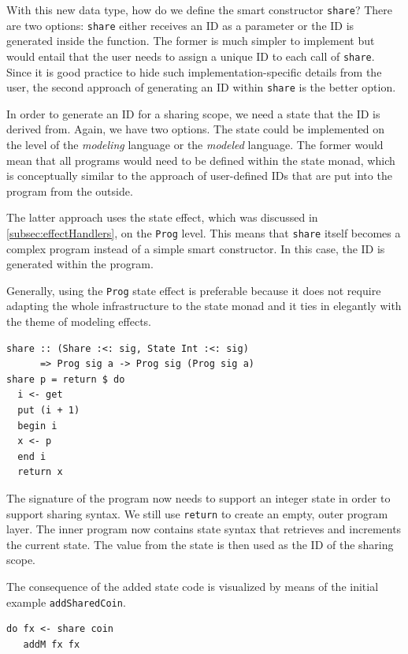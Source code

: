 \documentclass[a4paper, 11pt, fleqn, twoside]{scrreprt}
\newcommand{\hinl}[1]{\texttt{#1}}
\begin{document}
With this new data type, how do we define the smart constructor \hinl{share}?
There are two options: \hinl{share} either receives an ID as a parameter or the ID is generated inside the function.
The former is much simpler to implement but would entail that the user needs to assign a unique ID to each call of \hinl{share}.
Since it is good practice to hide such implementation-specific details from the user, the second approach of generating an ID within \hinl{share} is the better option.

In order to generate an ID for a sharing scope, we need a state that the ID is derived from.
Again, we have two options.
The state could be implemented on the level of the \textit{modeling} language or the \textit{modeled} language.
The former would mean that all programs would need to be defined within the state monad, which is conceptually similar to the approach of user-defined IDs that are put into the program from the outside.

The latter approach uses the state effect, which was discussed in \autoref{subsec:effectHandlers},  on the \hinl{Prog} level.
This means that \hinl{share} itself becomes a complex program instead of a simple smart constructor.
In this case, the ID is generated within the program.

Generally, using the \hinl{Prog} state effect is preferable because it does not require adapting the whole infrastructure to the state monad and it ties in elegantly with the theme of modeling effects.

\begin{verbatim}
share :: (Share :<: sig, State Int :<: sig) 
      => Prog sig a -> Prog sig (Prog sig a)
share p = return $ do 
  i <- get
  put (i + 1)
  begin i
  x <- p
  end i
  return x
\end{verbatim}

The signature of the program now needs to support an integer state in order to support sharing syntax.
We still use \hinl{return} to create an empty, outer program layer.
The inner program now contains state syntax that retrieves and increments the current state.
The value from the state is then used as the ID of the sharing scope.

The consequence of the added state code is visualized by means of the initial example \hinl{addSharedCoin}.

\begin{verbatim}
do fx <- share coin
   addM fx fx
\end{verbatim}
\end{document}
